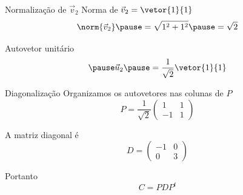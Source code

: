 \begin{resolution}{Normalização de $\vec{v}_2$}
  Norma de
  \(
    \vec{v}_2 = \vetor{1}{1}
  \)
  \pause
  \[
    \norm{\vec{v}_{2}}
    \pause
    = \sqrt{1^2 + 1^2}
    \pause
    = \sqrt{2}
  \]

  \pause
  Autovetor unitário
  \[
    \pause
    \vec{u}_{2}
    \pause
    = \frac{1}{\sqrt{2}}
      \vetor{1}{1}
  \]
\end{resolution}

\begin{resolution}{Diagonalização}
  Organizamos os autovetores nas colunas de $P$
  \[
    P =
    \frac{1}{\sqrt{2}}
    \begin{pmatrix}
      1  & 1 \\
      -1 & 1
    \end{pmatrix}
  \]

  \pause
  A matriz diagonal é
  \[
    D =
    \begin{pmatrix}
      -1 & 0 \\
      0  & 3
    \end{pmatrix}
  \]

  \pause
  Portanto
  \[
    C = P D P^t
  \]
\end{resolution}

